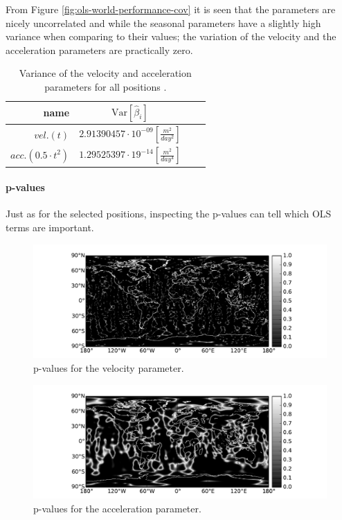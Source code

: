 From Figure \ref{fig:ols-world-performance-cov} it is seen that the parameters are nicely uncorrelated and while the seasonal parameters have a slightly high variance when comparing to their values; the variation of the velocity and the acceleration parameters are practically zero.
\begin{table}[H]
\centering
\begin{tabular}{r|c c c}
	name & $\mathrm{Var}[\hat{\beta}_i]$ \\ \hline
	$vel. (t)$ & $2.91390457 \cdot 10^{-09} [\frac{m^2}{day^2}]$  \\
	$acc. (0.5 \cdot t^2)$ & $1.29525397 \cdot 19^{-14} [\frac{m^2}{day^4}]$
\end{tabular}
\caption{Variance of the velocity and acceleration parameters for all positions .}
\end{table}
\paragraph{p-values} Just as for the selected positions, inspecting the p-values can tell which OLS terms are important.

\begin{figure}[H]
	\centering
	\includegraphics[width=\textwidth]{figures/ols-world-diagnostics-pvalue-1}
	\caption{p-values for the velocity parameter.}
	\label{fig:ols-world-diagnostics-pvalue-1}
\end{figure}

\begin{figure}[H]
	\centering
	\includegraphics[width=\textwidth]{figures/ols-world-diagnostics-pvalue-2}
	\caption{p-values for the acceleration parameter.}
	\label{fig:ols-world-diagnostics-pvalue-2}
\end{figure}

